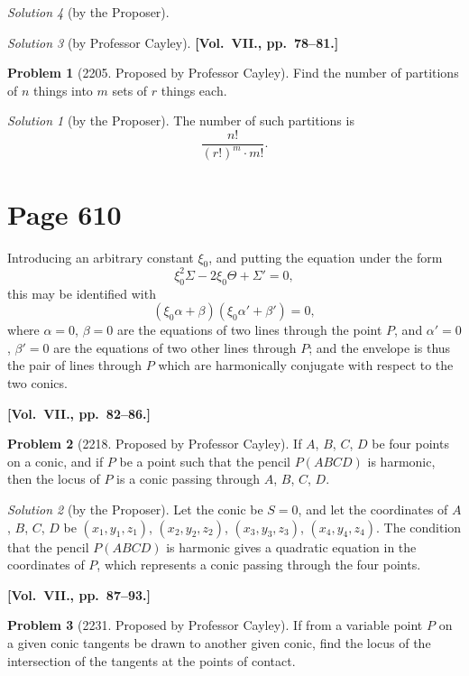 \documentclass[12pt,a4paper]{article}
\theoremstyle{plain}
\theoremstyle{definition}
\newtheorem{problem}{Problem}
\theoremstyle{remark}
\newtheorem*{solution}{Solution}
\begin{document}
\begin{solution}[by the Proposer]
\begin{solution}[by Professor Cayley]
\medskip\noindent\textbf{[Vol.~VII., pp.~78--81.]}

\begin{problem}[2205. Proposed by Professor Cayley]
Find the number of partitions of $n$ things into $m$ sets of $r$ things each.
\end{problem}

\begin{solution}[by the Proposer]
The number of such partitions is
\[
\frac{n!}{(r!)^m \cdot m!}.
\]
\end{solution}

\section*{Page 610}
\setcounter{page}{610}

Introducing an arbitrary constant $\xi_0$, and putting the equation under the form
\[
\xi_0^2 \Sigma - 2\xi_0 \Theta + \Sigma' = 0,
\]
this may be identified with
\[
(\xi_0 \alpha + \beta)(\xi_0 \alpha' + \beta') = 0,
\]
where $\alpha = 0$, $\beta = 0$ are the equations of two lines through the point $P$, and $\alpha' = 0$, $\beta' = 0$ are the equations of two other lines through $P$; and the envelope is thus the pair of lines through $P$ which are harmonically conjugate with respect to the two conics.

\medskip\noindent\textbf{[Vol.~VII., pp.~82--86.]}

\begin{problem}[2218. Proposed by Professor Cayley]
If $A$, $B$, $C$, $D$ be four points on a conic, and if $P$ be a point such that the pencil $P(ABCD)$ is harmonic, then the locus of $P$ is a conic passing through $A$, $B$, $C$, $D$.
\end{problem}

\begin{solution}[by the Proposer]
Let the conic be $S = 0$, and let the coordinates of $A$, $B$, $C$, $D$ be $(x_1, y_1, z_1)$, $(x_2, y_2, z_2)$, $(x_3, y_3, z_3)$, $(x_4, y_4, z_4)$. The condition that the pencil $P(ABCD)$ is harmonic gives a quadratic equation in the coordinates of $P$, which represents a conic passing through the four points.
\end{solution}

\medskip\noindent\textbf{[Vol.~VII., pp.~87--93.]}

\begin{problem}[2231. Proposed by Professor Cayley]
If from a variable point $P$ on a given conic tangents be drawn to another given conic, find the locus of the intersection of the tangents at the points of contact.
\end{problem}


\end{solution}
\end{solution}
\end{document}
